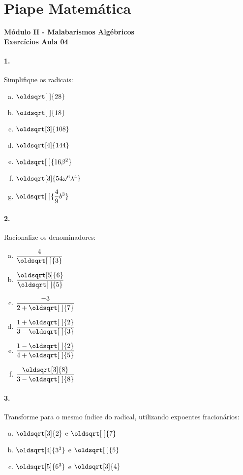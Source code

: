 \documentclass[a4paper,12pt]{article}
\renewcommand*{\sqrt}[2][\ ]{\oldsqrt[#1]{#2}}
\begin{document}
 
  
\section*{Piape Matemática} 
\textbf{Módulo II - Malabarismos Algébricos}\\
\textbf{Exercícios Aula 04}         
\begin{multicols}{2}
\paragraph{1.} Simplifique os radicais:
\begin{enumerate}[a)]
    \item $\sqrt{28}$ 
    \item $\sqrt{18}$
    \item $\sqrt[3]{108}$
    \item $\sqrt[4]{144}$
    \item $\sqrt{16\beta^2}$
    \item $\sqrt[3]{54\omega^6\lambda^4}$
    \item $\displaystyle\sqrt{\frac{4}{9}b^3}$ 
\end{enumerate} 

\paragraph*{2.} Racionalize os denominadores:
\begin{enumerate}[a)]
    \item $\displaystyle\frac{4}{\sqrt{3}}$
    \item $\displaystyle\frac{\sqrt[5]{6}}{\sqrt{5}}$
    \item $\displaystyle\frac{-3}{2+\sqrt{7}}$
    \item $\displaystyle\frac{1+\sqrt{2}}{3-\sqrt{3}}$
    \item $\displaystyle\frac{1-\sqrt{2}}{4+\sqrt{5}}$
    \item $\displaystyle\frac{\sqrt[3]{8}}{3-\sqrt{8}}$
\end{enumerate}
 
\paragraph*{3.} Transforme para o mesmo índice do radical, utilizando expoentes fracionários:
\begin{enumerate}[a)]
    \item $\sqrt[3]{2}$ e $\sqrt{7}$
    \item $\sqrt[4]{{3^3}}$ e $\sqrt{5}$
    \item $\sqrt[5]{6^3}$ e $\sqrt[3]{4}$
\end{enumerate}


\end{multicols}
\end{document}

